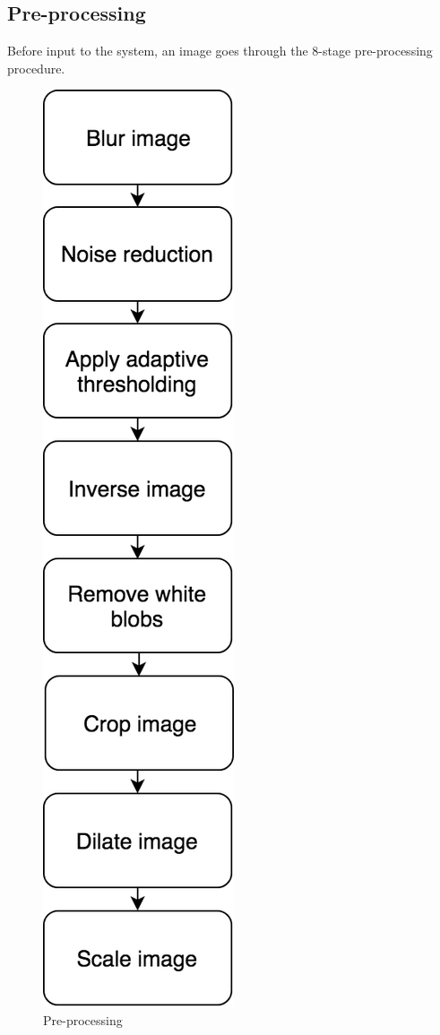 \documentclass[12pt, a4paper, oneside]{article}
\begin{document}
    	\subsection{Pre-processing}
    		Before input to the system, an image goes through the 8-stage pre-processing procedure. 
    		\begin{figure}[H]
    			\begin{center}
    				\includegraphics[scale=0.4]{preProcess.png}
    				\caption{Pre-processing}
    				\label{fig:Pre-processing}
    			\end{center}
    		\end{figure}
    
\end{document}
